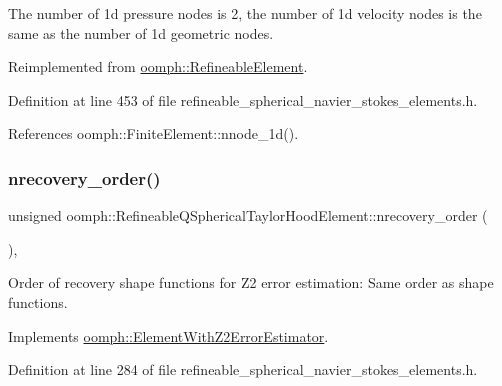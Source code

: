 The number of 1d pressure nodes is 2, the number of 1d velocity nodes is the same as the number of 1d geometric nodes. 



Reimplemented from \hyperlink{classoomph_1_1RefineableElement_a850180084aaf164550b4f4978b42cda7}{oomph\+::\+Refineable\+Element}.



Definition at line 453 of file refineable\+\_\+spherical\+\_\+navier\+\_\+stokes\+\_\+elements.\+h.



References oomph\+::\+Finite\+Element\+::nnode\+\_\+1d().

\mbox{\label{classoomph_1_1RefineableQSphericalTaylorHoodElement_ae08d92d00ba848f4c6f14ad83433334e}} 
\subsubsection{\texorpdfstring{nrecovery\+\_\+order()}{nrecovery\_order()}}
{\footnotesize\ttfamily unsigned oomph\+::\+Refineable\+Q\+Spherical\+Taylor\+Hood\+Element\+::nrecovery\+\_\+order (\begin{DoxyParamCaption}{ }\end{DoxyParamCaption})\hspace{0.3cm}{\ttfamily [inline]}, {\ttfamily [virtual]}}



Order of recovery shape functions for Z2 error estimation\+: Same order as shape functions. 



Implements \hyperlink{classoomph_1_1ElementWithZ2ErrorEstimator_af39480835bd3e0f6b2f4f7a9a4044798}{oomph\+::\+Element\+With\+Z2\+Error\+Estimator}.



Definition at line 284 of file refineable\+\_\+spherical\+\_\+navier\+\_\+stokes\+\_\+elements.\+h.

\mbox{\label{classoomph_1_1RefineableQSphericalTaylorHoodElement_a9b9f57dd6068133cf6b90ff478e96ac5}} 
